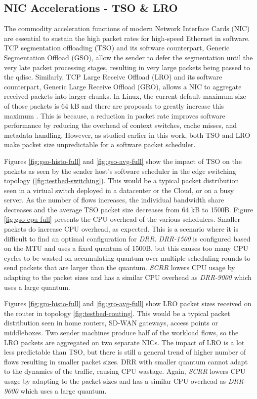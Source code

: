 \subsection{NIC Accelerations - TSO \& LRO}
\label{sec:scrr-eval-gsogro}




The commodity acceleration functions of modern Network Interface Cards
(NIC) are essential to sustain the high packet rates for high-speed
Ethernet in software. TCP segmentation offloading (TSO)
\cite{linux-gso-gro} and its software counterpart, Generic
Segmentation Offload (GSO), allow the sender to defer the segmentation
until the very late packet processing stages, resulting in very large
packets being passed to the qdisc. Similarly, TCP Large Receive Offload
(LRO) and its software counterpart, Generic Large Receive
Offload (GRO), allows a NIC to aggregate received packets into larger
chunks. In Linux, the current default maximum size of those packets is 64 kB and there are proposals to greatly increase this maximum
\cite{big-tcp}. This is because, a reduction in packet rate improves
software performance by reducing the overhead of context switches,
cache misses, and metadata handling. However, as studied earlier in
this work, both TSO and LRO make packet size unpredictable for
a software packet scheduler.

Figures \ref{fig:gso-histo-full} and \ref{fig:gso-avg-full} show the
impact of TSO on the packets as seen by the sender host's software
scheduler in the edge switching topology
(\ref{fig:testbed-switching}). This would be a typical packet
distribution seen in a virtual switch deployed in a datacenter or the
Cloud, or on a busy server. As the number of flows increases, the
individual bandwidth share decreases and the average TSO packet size
decreases from 64 kB to 1500B. Figure \ref{fig:gso-cpu-full} presents
the CPU overhead of the various schedulers. Smaller packets do
increase CPU overhead, as expected. This is a scenario where it is
difficult to find an optimal configuration for \textit{DRR}.
\textit{DRR-1500} is configured based on the MTU and uses a fixed
quantum of 1500B, but this causes too many CPU cycles to be wasted on
accumulating quantum over multiple scheduling rounds to send packets
that are larger than the quantum. \textit{SCRR} lowers CPU usage by
adapting to the packet sizes and has a similar CPU overhead as
\textit{DRR-9000} which uses a large quantum.

Figures \ref{fig:gro-histo-full} and \ref{fig:gro-avg-full} show LRO
packet sizes received on the router in topology
\ref{fig:testbed-routing}. This would be a typical packet distribution
seen in home routers, SD-WAN gateways, access points or
middleboxes. Two sender machines produce half of the workload flows,
so the LRO packets are aggregated on two separate NICs. The impact of
LRO is a lot less predictable than TSO, but there is still a general
trend of higher number of flows resulting in smaller packet sizes. DRR
with smaller quantum cannot adapt to the dynamics of the traffic,
causing CPU wastage. Again, \textit{SCRR} lowers CPU usage by adapting
to the packet sizes and has a similar CPU overhead as
\textit{DRR-9000} which uses a large quantum.

